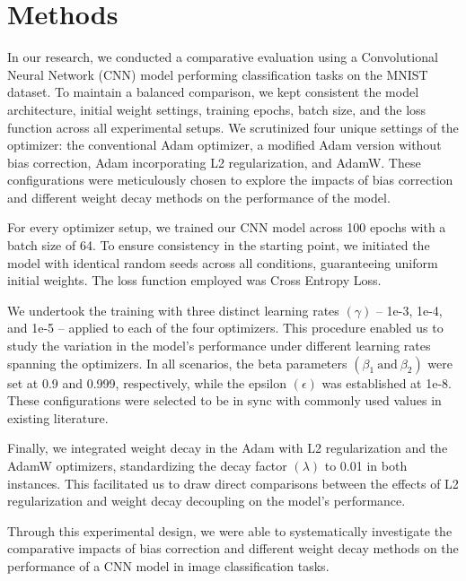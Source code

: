 \documentclass[14pt,twocolumn,letterpaper]{extarticle}
\begin{document}
\section{Methods}
In our research, we conducted a comparative evaluation using a Convolutional Neural Network (CNN) model performing classification tasks on the MNIST dataset. To maintain a balanced comparison, we kept consistent the model architecture, initial weight settings, training epochs, batch size, and the loss function across all experimental setups. We scrutinized four unique settings of the optimizer: the conventional Adam optimizer, a modified Adam version without bias correction, Adam incorporating L2 regularization, and AdamW. These configurations were meticulously chosen to explore the impacts of bias correction and different weight decay methods on the performance of the model.\par
For every optimizer setup, we trained our CNN model across 100 epochs with a batch size of 64. To ensure consistency in the starting point, we initiated the model with identical random seeds across all conditions, guaranteeing uniform initial weights. The loss function employed was Cross Entropy Loss.\par
We undertook the training with three distinct learning rates $\left(\gamma\right)$ – 1e-3, 1e-4, and 1e-5 – applied to each of the four optimizers. This procedure enabled us to study the variation in the model's performance under different learning rates spanning the optimizers. In all scenarios, the beta parameters $\left(\beta_{1}\ \text{and}\ \beta_{2}\right)$ were set at 0.9 and 0.999, respectively, while the epsilon $\left(\epsilon\right)$ was established at 1e-8. These configurations were selected to be in sync with commonly used values in existing literature.\par
Finally, we integrated weight decay in the Adam with L2 regularization and the AdamW optimizers, standardizing the decay factor $\left(\lambda\right)$ to 0.01 in both instances. This facilitated us to draw direct comparisons between the effects of L2 regularization and weight decay decoupling on the model's performance.\par
Through this experimental design, we were able to systematically investigate the comparative impacts of bias correction and different weight decay methods on the performance of a CNN model in image classification tasks.
\end{document}
